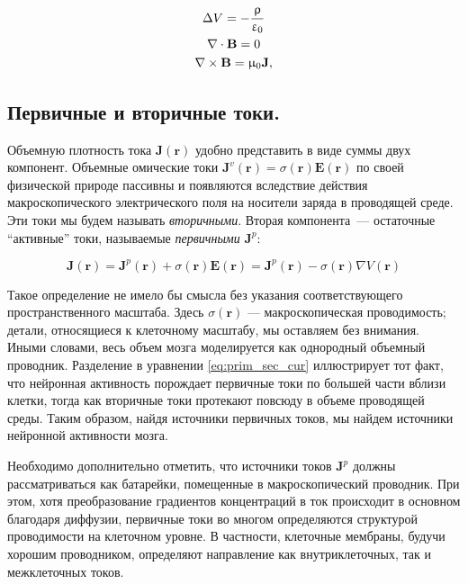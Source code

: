 \begin{gather}
    \Delta V = -\frac{\uprho}{\upvarepsilon_0} \label{eq:max_quasi1} \\
    \nabla \cdot \mathbf{B} = 0 \label{eq:max_quasi2} \\
    \nabla \times \mathbf{B} = \upmu_0 \mathbf{J} \label{eq:max_quasi3},
\end{gather}

\subsection{Первичные и вторичные токи.}
Объемную плотность тока $\mathbf{J}(\mathbf{r})$ удобно
представить в виде суммы двух компонент. Объемные омические токи
$\mathbf{J}^v(\mathbf{r}) = \sigma(\mathbf{r}) \mathbf{E}(\mathbf{r})$ по своей
физической природе пассивны и появляются вследствие действия макроскопического
электрического поля на носители заряда в проводящей среде.  Эти токи мы будем
называть \emph{вторичными}. Вторая компонента~--- остаточные ``активные'' токи, называемые
\emph{первичными} $\mathbf{J}^p$:

\begin{equation}
    \mathbf{J}(\mathbf{r}) =
    \mathbf{J}^p(\mathbf{r}) + \sigma(\mathbf{r}) \mathbf{E}(\mathbf{r}) =
    \mathbf{J}^p(\mathbf{r}) - \sigma(\mathbf{r}) \nabla V(\mathbf{r})
    \label{eq:prim_sec_cur}
\end{equation}

Такое определение не имело бы смысла без указания соответствующего
пространственного масштаба.  Здесь $\sigma(\mathbf{r})$ --- макроскопическая
проводимость; детали, относящиеся к клеточному масштабу, мы оставляем без
внимания. Иными словами, весь объем мозга моделируется как однородный объемный
проводник.  Разделение в уравнении \ref{eq:prim_sec_cur} иллюстрирует тот факт,
что нейронная активность порождает первичные токи по большей части вблизи
клетки, тогда как вторичные токи протекают повсюду в объеме проводящей среды.
Таким образом, найдя источники первичных токов, мы найдем источники
нейронной активности мозга.

Необходимо дополнительно отметить, что источники токов $\mathbf{J}^p$ должны
рассматриваться как батарейки, помещенные в макроскопический проводник. При
этом, хотя преобразование градиентов концентраций в ток происходит в основном
благодаря диффузии, первичные токи во многом определяются структурой
проводимости на клеточном уровне. В частности, клеточные мембраны, будучи
хорошим проводником, определяют направление как внутриклеточных, так и
межклеточных токов.

